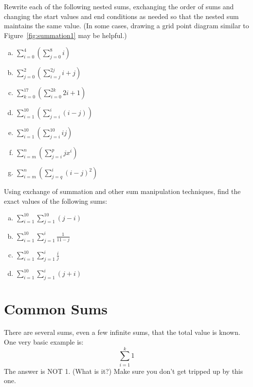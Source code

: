 \begin {exercise}{}
Rewrite each of the following nested sums, exchanging the order of sums and changing the start values and end conditions as needed so that the nested sum maintains the same value. (In some cases, drawing a grid point diagram similar to Figure~\ref{fig:summation1} may be helpful.)
\begin {enumerate}[(a)]
\item
$\displaystyle{\sum_{i=0}^{4}\left(\sum_{j=0}^{8}i\right)}$
\item
$\displaystyle{\sum_{j=0}^{2}\left( \sum_{i=j}^{2j}i+j\right)}$
\item
$\displaystyle{\sum_{k=0}^{17}\left(\sum_{i=0}^{2k}2i+1 \right)}$
\item
$\displaystyle{\sum_{i=1}^{10}\left(\sum_{j=i}^{i} (i-j) \right)}$
\item
$\displaystyle{\sum_{i=1}^{10}\left(\sum_{j=i}^{10} ij \right)}$
\item
$\displaystyle{\sum_{i=m}^{n}\left(\sum_{j=i}^{p}jx^i \right)}$
\item
$\displaystyle{\sum_{i=m}^{n}\left(\sum_{j=q}^{i}(i-j)^2 \right)}$
\end {enumerate}
\end{exercise}

\begin{exercise}{}
Using exchange of summation and other sum manipulation techniques, find the exact values of the following sums:
\begin{enumerate}[(a)]
\item
$\displaystyle{\sum_{i=1}^{10} \sum_{j=1}^{10} (j-i)}$
\item
$\displaystyle{\sum_{i=1}^{10} \sum_{j=1}^i \frac{1}{11-j}}$
\item
$\displaystyle{\sum_{i=1}^{10} \sum_{j=1}^i \frac{i}{j}}$
\item
$\displaystyle{\sum_{i=1}^{10} \sum_{j=1}^i (j+i)}$
\end{enumerate}
\end{exercise}

\section{Common Sums}
There are several sums, even a few infinite sums, that the total value is known. One very basic example is:
\[\sum_{i=1}^{k}1\]
The answer is NOT 1. (What is it?) Make sure you don't get tripped up by this one.


